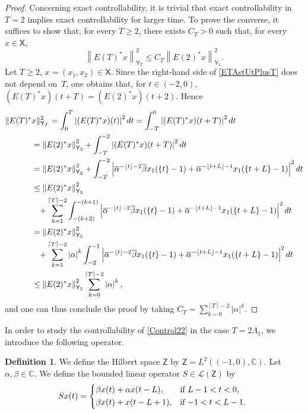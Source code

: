 \documentclass[10pt]{amsart}
\theoremstyle{plain}
\theoremstyle{definition}
\newtheorem{defi}[theo]{Definition}
\newcommand{\norm}[1]{\left\lVert #1\right\lVert}
\newcommand{\abs}[1]{\left\lvert #1\right \rvert}
\newcommand{\floor}[1]{\left\lfloor #1 \right\rfloor}
\newcommand{\ceil}[1]{\left\lceil #1 \right\rceil}
\begin{document}
\begin{proof}
Concerning exact controllability, it is trivial that exact controllability in $T = 2$ implies exact controllability for larger time. To prove the converse, it suffices to show that, for every $T \geq 2$, there exists $C_T > 0$ such that, for every $x \in \mathsf X$,
\[
\norm{E(T)^\ast x}_{\mathsf Y_T}^2 \leq C_T \norm{E(2)^\ast x}_{\mathsf Y_2}^2.
\]
Let $T \geq 2$, $x = (x_1, x_2) \in \mathsf X$. Since the right-hand side of \eqref{ETAstUtPlusT} does not depend on~$T$, one obtains that, for $t \in (-2, 0)$, $(E(T)^\ast x)(t + T) = (E(2)^\ast x)(t + 2)$. Hence
\begin{align*}
\Vert E(T)^\ast& x\Vert_{\mathsf Y_T}^2  = \int_0^T \abs{(E(T)^\ast x)(t)}^2 dt = \int_{-T}^0 \abs{(E(T)^\ast x)(t + T)}^2 dt  \\
& = \norm{E(2)^\ast x}_{\mathsf Y_2}^2 + \int_{-T}^{-2} \abs{(E(T)^\ast x)(t + T)}^2 dt  \\
& = \norm{E(2)^\ast x}_{\mathsf Y_2}^2 + \int_{-T}^{-2} \abs{\overline\alpha^{-\floor{t} - 2} \overline\beta x_1(\{t\} - 1) + \overline\alpha^{-\floor{t + L} - 1} x_1(\{t + L\} - 1)}^2 dt  \\
& \leq \norm{E(2)^\ast x}_{\mathsf Y_2}^2 \\
& \hphantom{\leq} {} + \sum_{k=1}^{\ceil{T} - 2} \int_{-(k+2)}^{-(k+1)} \abs{\overline\alpha^{-\floor{t} - 2} \overline\beta x_1(\{t\} - 1) + \overline\alpha^{-\floor{t + L} - 1} x_1(\{t + L\} - 1)}^2 dt  \\
& = \norm{E(2)^\ast x}_{\mathsf Y_2}^2 \\
& \hphantom{=} {} + \sum_{k=1}^{\ceil{T} - 2} \abs{\alpha}^k \int_{-2}^{-1} \abs{\overline\alpha^{-\floor{t} - 2} \overline\beta x_1(\{t\} - 1) + \overline\alpha^{-\floor{t + L} - 1} x_1(\{t + L\} - 1)}^2 dt  \\
& \leq \norm{E(2)^\ast x}_{\mathsf Y_2}^2 \sum_{k=0}^{\ceil{T} - 2} \abs{\alpha}^k,
\end{align*}
and one can thus conclude the proof by taking $C_T = \sum_{k=0}^{\ceil{T} - 2} \abs{\alpha}^k$.
\end{proof}

In order to study the controllability of \eqref{Control22} in the case $T = 2 \Lambda_1$, we introduce the following operator.

\begin{defi}
\label{DefinitionS}
We define the Hilbert space $\mathsf Z$ by $\mathsf Z = L^2((-1, 0), \mathbb C)$. Let $\alpha, \beta \in \mathbb C$. We define the bounded linear operator $S \in \mathcal L(\mathsf Z)$ by
\begin{equation}
\label{DefS}
S x(t) =
\begin{dcases*}
\beta x(t) + \alpha x(t - L), & if $L - 1 < t < 0$, \\
\beta x(t) + x(t - L + 1), & if $-1 < t < L - 1$.
\end{dcases*}
\end{equation}
\end{defi}
\end{document}
